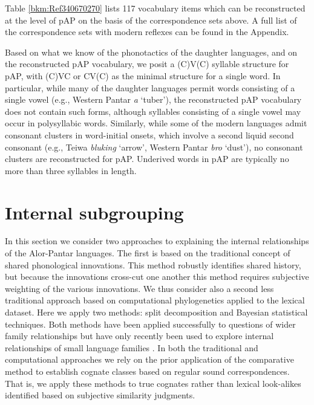 Table \ref{bkm:Ref340670270} lists 117 vocabulary items which can be reconstructed at the level of pAP on the basis of the correspondence sets above. A full list of the correspondence sets with modern reflexes can be found in the Appendix.
 


Based on what we know of the phonotactics of the daughter languages, and on the reconstructed pAP vocabulary, we posit a (C)V(C) syllable structure for pAP, with (C)VC or CV(C) as the minimal structure for a single word. In particular, while many of the daughter languages permit words consisting of a single vowel (e.g., Western Pantar \textit{a }`tuber'), the reconstructed pAP vocabulary does not contain such forms, although syllables consisting of a single vowel may occur in polysyllabic words. Similarly, while some of the modern languages admit consonant clusters in word-initial onsets, which involve a second liquid second consonant (e.g., Teiwa \textit{bluking} `arrow', Western Pantar \textit{bro} `dust'), no consonant clusters are reconstructed for pAP. Underived words in pAP are typically no more than three syllables in length.

\section{Internal subgrouping}
In this section we consider two approaches to explaining the internal relationships of the Alor-Pantar languages. The first is based on the traditional concept of shared phonological innovations. This method robustly identifies shared history, but because the innovations cross-cut one another this method requires subjective weighting of the various innovations. We thus consider also a second less traditional approach based on computational phylogenetics applied to the lexical dataset. Here we apply two methods: split decomposition and Bayesian statistical techniques. Both methods have been applied successfully to questions of wider family relationships but have only recently been used to explore internal relationships of small language families \citep[e.g.][]{DunnEtAl2011}. In both the traditional and computational approaches we rely on the prior application of the comparative method to establish cognate classes based on regular sound correspondences. That is, we apply these methods to true cognates rather than 
lexical look-alikes identified based on subjective similarity judgments.

